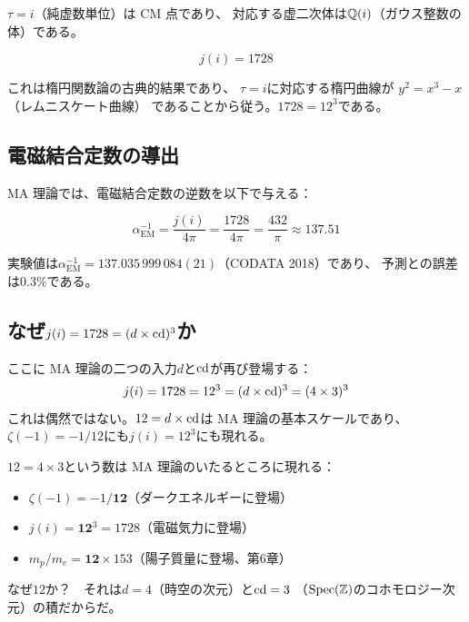 $\tau = i$（純虚数単位）は CM 点であり、
対応する虚二次体は$\mathbb{Q}(i)$（ガウス整数の体）である。

\begin{theorem}[$j(i)$の値]
\begin{equation}
j(i) = 1728
\end{equation}
\end{theorem}

これは楕円関数論の古典的結果であり、
$\tau = i$に対応する楕円曲線が
$y^2 = x^3 - x$（レムニスケート曲線）
であることから従う。$1728 = 12^3$である。

\subsection{電磁結合定数の導出}

MA 理論では、電磁結合定数の逆数を以下で与える：

\begin{keyresult}[電磁結合定数]
\begin{equation}
\alpha_{\mathrm{EM}}^{-1} = \frac{j(i)}{4\pi} = \frac{1728}{4\pi} = \frac{432}{\pi}
\approx 137.51
\end{equation}
\end{keyresult}

実験値は$\alpha_{\mathrm{EM}}^{-1} = 137.035\,999\,084(21)$（CODATA 2018）であり、
予測との誤差は$0.3\%$である。

\subsection{なぜ$j(i) = 1728 = (d \times \operatorname{cd})^3$か}

ここに MA 理論の二つの入力$d$と$\operatorname{cd}$が再び登場する：
\begin{equation}
j(i) = 1728 = 12^3 = (d \times \operatorname{cd})^3 = (4 \times 3)^3
\end{equation}
これは偶然ではない。$12 = d \times \operatorname{cd}$は MA 理論の基本スケールであり、
$\zeta(-1) = -1/12$にも$j(i) = 12^3$にも現れる。

\begin{hsbox}
$12 = 4 \times 3$という数は MA 理論のいたるところに現れる：
\begin{itemize}[nosep]
\item $\zeta(-1) = -1/\mathbf{12}$（ダークエネルギーに登場）
\item $j(i) = \mathbf{12}^3 = 1728$（電磁気力に登場）
\item $m_p/m_e = \mathbf{12} \times 153$（陽子質量に登場、第6章）
\end{itemize}
なぜ$12$か？　それは$d=4$（時空の次元）と$\operatorname{cd}=3$
（$\operatorname{Spec}(\mathbb{Z})$のコホモロジー次元）の積だからだ。
\end{hsbox}

